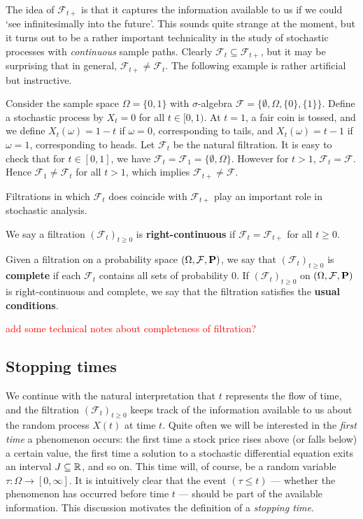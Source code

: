 The idea of $\mathcal{F}_{t+}$ is that it captures the information available to us if we could `see infinitesimally into the future'. This sounds quite strange at the moment, but it turns out to be a rather important technicality in the study of stochastic processes with \emph{continuous} sample paths. Clearly $\mathcal{F}_t\subseteq\mathcal{F}_{t+}$, but it may be surprising that in general, $\mathcal{F}_{t+}\ne\mathcal{F}_t$. The following example is rather artificial but instructive.
\begin{example}
Consider the sample space $\Omega = \{0, 1\}$ with $\sigma$-algebra $\mathcal{F} = \{ \emptyset, \Omega, \{0\}, \{1\} \}$. Define a stochastic process by $X_t = 0$ for all $t \in [0, 1)$. At $t=1$, a fair coin is tossed, and we define $X_t(\omega) = 1-t$ if $\omega = 0$, corresponding to tails, and $X_t(\omega) = t-1$ if $\omega = 1$, corresponding to heads. Let $\mathcal{F}_t$ be the natural filtration. It is easy to check that for $t \in [0,1]$, we have $\mathcal{F}_t = \mathcal{F}_1 = \{ \emptyset, \Omega \}$. However for $t > 1$, $\mathcal{F}_t = \mathcal{F}$. Hence $\mathcal{F}_1\ne\mathcal{F}_t$ for all $t>1$, which implies $\mathcal{F}_{t+}\ne\mathcal{F}$.
\end{example}

Filtrations in which $\mathcal{F}_t$ does coincide with $\mathcal{F}_{t+}$ play an important role in stochastic analysis.
\begin{definition}
\label{def:usual}
We say a filtration $(\mathcal{F}_t)_{t\ge 0}$ is \textbf{right-continuous} if $\mathcal{F}_t = \mathcal{F}_{t+}$ for all $t\ge 0$.

Given a filtration on a probability space $(\Omega,\mathcal{F},\mathbf{P})$, we say that $(\mathcal{F}_t)_{t \ge 0}$ is \textbf{complete} if each $\mathcal{F}_t$ contains all sets of probability 0. If $(\mathcal{F}_t)_{t\ge 0}$ on $(\Omega,\mathcal{F},\mathbf{P})$ is right-continuous and complete, we say that the filtration satisfies the \textbf{usual conditions}.
\end{definition}

\textcolor{red}{add some technical notes about completeness of filtration?}

\subsection{Stopping times}
We continue with the natural interpretation that $t$ represents the flow of time, and the filtration $(\mathcal{F}_t)_{t\ge 0}$ keeps track of the information available to us about the random process $X(t)$ at time $t$. Quite often we will be interested in the \emph{first time} a phenomenon occurs: the first time a stock price rises above (or falls below) a certain value, the first time a solution to a stochastic differential equation exits an interval $J\subseteq\mathbb{R}$, and so on. This time will, of course, be a random variable $\tau:\Omega\to [0,\infty]$. It is intuitively clear that the event $(\tau\le t)$ --- whether the phenomenon has occurred before time $t$ --- should be part of the available information. This discussion motivates the definition of a \emph{stopping time}.

